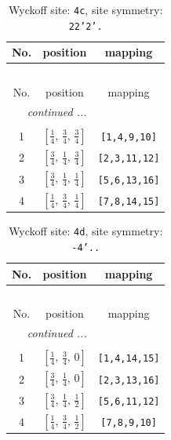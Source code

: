 \documentclass[fleqn,8pt]{jsarticle}
\begin{document}
\renewcommand{\arraystretch}{1.2}
\begin{longtable}{ccc}
\caption{Wyckoff site: {\tt 4c}, site symmetry: {\tt 22'2'.}}
 \\
 \hline \hline
No. & position & mapping \\ \hline \endfirsthead

\multicolumn{2}{l}{\tablename\ \thetable{}} \\
 \hline \hline
No. & position & mapping \\ \hline \endhead

 \hline \hline
\multicolumn{2}{r}{\footnotesize\it continued ...} \\ \endfoot

 \hline \hline
\multicolumn{2}{r}{} \\ \endlastfoot

1 & $\left[ \frac{1}{4},\, \frac{3}{4},\, \frac{3}{4} \right]$ & {\tt [1,4,9,10]} \\ \hline
2 & $\left[ \frac{3}{4},\, \frac{1}{4},\, \frac{3}{4} \right]$ & {\tt [2,3,11,12]} \\ \hline
3 & $\left[ \frac{3}{4},\, \frac{1}{4},\, \frac{1}{4} \right]$ & {\tt [5,6,13,16]} \\ \hline
4 & $\left[ \frac{1}{4},\, \frac{3}{4},\, \frac{1}{4} \right]$ & {\tt [7,8,14,15]} \\
\end{longtable}
\renewcommand{\arraystretch}{1.2}
\begin{longtable}{ccc}
\caption{Wyckoff site: {\tt 4d}, site symmetry: {\tt -4'..}}
 \\
 \hline \hline
No. & position & mapping \\ \hline \endfirsthead

\multicolumn{2}{l}{\tablename\ \thetable{}} \\
 \hline \hline
No. & position & mapping \\ \hline \endhead

 \hline \hline
\multicolumn{2}{r}{\footnotesize\it continued ...} \\ \endfoot

 \hline \hline
\multicolumn{2}{r}{} \\ \endlastfoot

1 & $\left[ \frac{1}{4},\, \frac{3}{4},\, 0 \right]$ & {\tt [1,4,14,15]} \\ \hline
2 & $\left[ \frac{3}{4},\, \frac{1}{4},\, 0 \right]$ & {\tt [2,3,13,16]} \\ \hline
3 & $\left[ \frac{3}{4},\, \frac{1}{4},\, \frac{1}{2} \right]$ & {\tt [5,6,11,12]} \\ \hline
4 & $\left[ \frac{1}{4},\, \frac{3}{4},\, \frac{1}{2} \right]$ & {\tt [7,8,9,10]} \\
\end{longtable}
\end{document}
